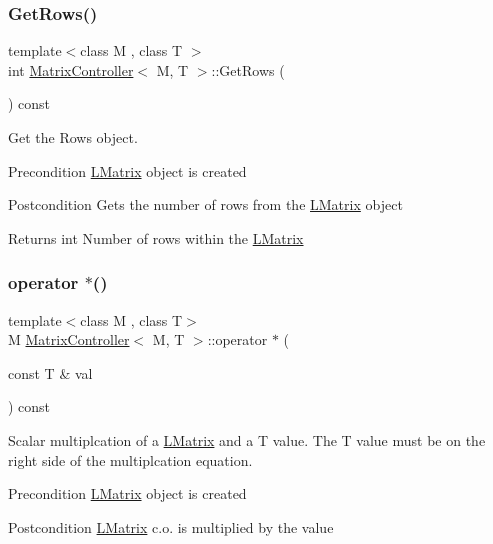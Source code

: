 \subsubsection{\texorpdfstring{GetRows()}{GetRows()}}
{\footnotesize\ttfamily template$<$class M , class T $>$ \\
int \mbox{\hyperlink{class_matrix_controller}{Matrix\+Controller}}$<$ M, T $>$\+::Get\+Rows (\begin{DoxyParamCaption}{ }\end{DoxyParamCaption}) const}



Get the Rows object. 

\begin{DoxyPrecond}{Precondition}
\mbox{\hyperlink{class_l_matrix}{L\+Matrix}} object is created 
\end{DoxyPrecond}
\begin{DoxyPostcond}{Postcondition}
Gets the number of rows from the \mbox{\hyperlink{class_l_matrix}{L\+Matrix}} object 
\end{DoxyPostcond}
\begin{DoxyReturn}{Returns}
int Number of rows within the \mbox{\hyperlink{class_l_matrix}{L\+Matrix}} 
\end{DoxyReturn}
\mbox{\label{class_matrix_controller_abe35dc2b5a0ce975799995097486893e}} 
\subsubsection{\texorpdfstring{operator $\ast$()}{operator *()}}
{\footnotesize\ttfamily template$<$class M , class T$>$ \\
M \mbox{\hyperlink{class_matrix_controller}{Matrix\+Controller}}$<$ M, T $>$\+::operator $\ast$ (\begin{DoxyParamCaption}\item[{const T \&}]{val }\end{DoxyParamCaption}) const}



Scalar multiplcation of a \mbox{\hyperlink{class_l_matrix}{L\+Matrix}} and a T value. The T value must be on the right side of the multiplcation equation. 

\begin{DoxyPrecond}{Precondition}
\mbox{\hyperlink{class_l_matrix}{L\+Matrix}} object is created 
\end{DoxyPrecond}
\begin{DoxyPostcond}{Postcondition}
\mbox{\hyperlink{class_l_matrix}{L\+Matrix}} c.\+o. is multiplied by the value 
\end{DoxyPostcond}

